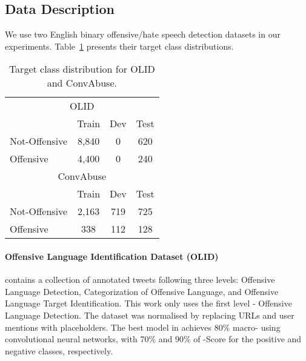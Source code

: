 \documentclass[11pt,a4paper]{article}
\begin{document}
\subsection{Data Description} \label{sec:data-description}
We use two English binary offensive/hate speech detection datasets in our experiments. Table~\ref{tab:datasets-distributions} presents their target class distributions. 

\begin{table}[htb]
\centering
\begin{tabular}{lccc}
\hline
\multicolumn{4}{c}{OLID}                                       \\ 
         & Train           & Dev             & Test            \\ \hline
Not-Offensive & 8,840  & 0               & 620   \\
Offensive & 4,400  & 0             & 240   \\ \hline
\multicolumn{4}{c}{ConvAbuse}                                  \\ 
         & Train           & Dev             & Test            \\ \hline
Not-Offensive & 2,163  & 719   & 725   \\
Offensive & 338   & 112   & 128   \\ \hline
\end{tabular}\caption{\label{tab:datasets-distributions}Target class distribution for OLID and ConvAbuse.}
\end{table}



\paragraph{Offensive Language Identification Dataset (OLID)} \citep{oliddataset} contains a collection of annotated tweets following three levels: Offensive Language Detection, Categorization of Offensive Language, and Offensive Language Target Identification. This work only uses the first level - Offensive Language Detection. The dataset was normalised by replacing URLs and user mentions with placeholders. The best model in \citep{oliddataset} achieves 80\% macro- using convolutional neural networks, with 70\% and 90\% of -Score for the positive and negative classes, respectively.
\end{document}
